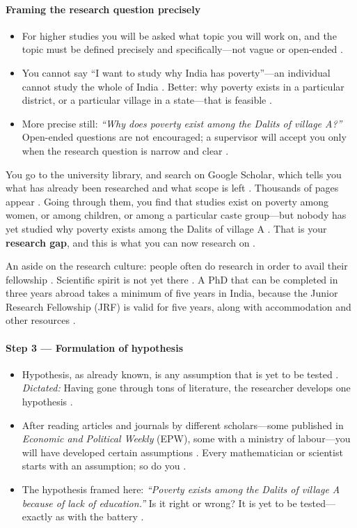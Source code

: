 \paragraph{Framing the research question precisely}
\begin{itemize}
    \item For higher studies you will be asked what topic you will work on, and the topic must be defined precisely and specifically---not vague or open-ended .
    \item You cannot say ``I want to study why India has poverty''---an individual cannot study the whole of India . Better: why poverty exists in a particular district, or a particular village in a state---that is feasible .
    \item More precise still: \textit{``Why does poverty exist among the Dalits of village A?''}  Open-ended questions are not encouraged; a supervisor will accept you only when the research question is narrow and clear .
\end{itemize}

\begin{ExampleBox}
You go to the university library, and search on Google Scholar, which tells you what has already been researched and what scope is left . Thousands of pages appear . Going through them, you find that studies exist on poverty among women, or among children, or among a particular caste group---but nobody has yet studied why poverty exists among the Dalits of village A . That is your \textbf{research gap}, and this is what you can now research on .
\end{ExampleBox}

\begin{CriticalPoint}
An aside on the research culture: people often do research in order to avail their fellowship . Scientific spirit is not yet there . A PhD that can be completed in three years abroad takes a minimum of five years in India, because the Junior Research Fellowship (JRF) is valid for five years, along with accommodation and other resources .
\end{CriticalPoint}

\paragraph{Step 3 --- Formulation of hypothesis}
\begin{itemize}
    \item Hypothesis, as already known, is any assumption that is yet to be tested . \textit{Dictated:} Having gone through tons of literature, the researcher develops one hypothesis .
    \item After reading articles and journals by different scholars---some published in \textit{Economic and Political Weekly} (EPW), some with a ministry of labour---you will have developed certain assumptions . Every mathematician or scientist starts with an assumption; so do you .
    \item The hypothesis framed here: \textit{``Poverty exists among the Dalits of village A because of lack of education.''}  Is it right or wrong? It is yet to be tested---exactly as with the battery .
\end{itemize}

